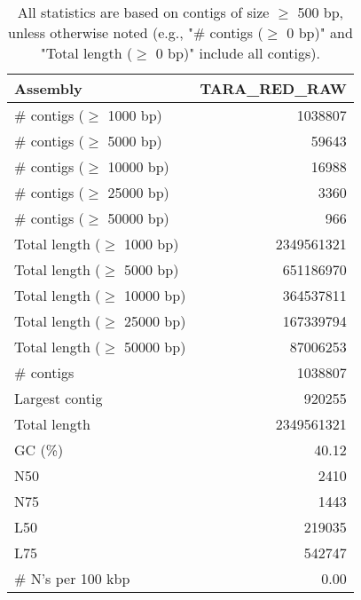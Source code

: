 \documentclass[12pt,a4paper]{article}
\begin{document}
\begin{table}[ht]
\begin{center}
\caption{All statistics are based on contigs of size $\geq$ 500 bp, unless otherwise noted (e.g., "\# contigs ($\geq$ 0 bp)" and "Total length ($\geq$ 0 bp)" include all contigs).}
\begin{tabular}{|l*{1}{|r}|}
\hline
Assembly & TARA\_RED\_RAW \\ \hline
\# contigs ($\geq$ 1000 bp) & 1038807 \\ \hline
\# contigs ($\geq$ 5000 bp) & 59643 \\ \hline
\# contigs ($\geq$ 10000 bp) & 16988 \\ \hline
\# contigs ($\geq$ 25000 bp) & 3360 \\ \hline
\# contigs ($\geq$ 50000 bp) & 966 \\ \hline
Total length ($\geq$ 1000 bp) & 2349561321 \\ \hline
Total length ($\geq$ 5000 bp) & 651186970 \\ \hline
Total length ($\geq$ 10000 bp) & 364537811 \\ \hline
Total length ($\geq$ 25000 bp) & 167339794 \\ \hline
Total length ($\geq$ 50000 bp) & 87006253 \\ \hline
\# contigs & 1038807 \\ \hline
Largest contig & 920255 \\ \hline
Total length & 2349561321 \\ \hline
GC (\%) & 40.12 \\ \hline
N50 & 2410 \\ \hline
N75 & 1443 \\ \hline
L50 & 219035 \\ \hline
L75 & 542747 \\ \hline
\# N's per 100 kbp & 0.00 \\ \hline
\end{tabular}
\end{center}
\end{table}
\end{document}
